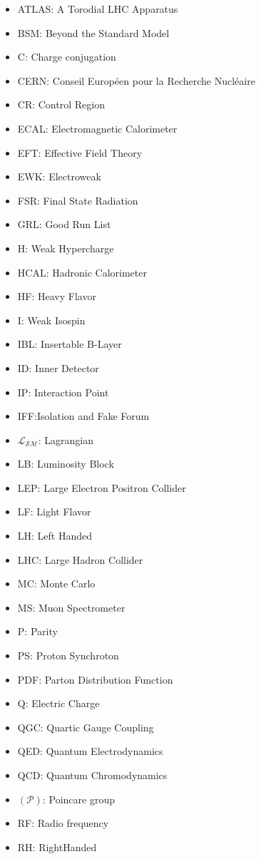 \begin{itemize}
\item{ATLAS: A Torodial LHC Apparatus}
\item{BSM: Beyond the Standard Model}
\item{C: Charge conjugation}
\item{CERN: Conseil Europ\'{e}en pour la Recherche Nucl\'{e}aire}
\item{CR: Control Region}
\item{ECAL: Electromagnetic Calorimeter} 
\item{EFT: Effective Field Theory}
\item{EWK: Electroweak}
\item{FSR: Final State Radiation}
\item{GRL: Good Run List}
\item{H: Weak Hypercharge}
\item{HCAL: Hadronic Calorimeter}
\item{HF: Heavy Flavor}
\item{I: Weak Isospin}
\item{IBL: Insertable B-Layer} 
\item{ID: Inner Detector} 
\item{IP: Interaction Point}
\item{IFF:Isolation and Fake Forum}
\item{$\mathcal{L_{SM}}$: Lagrangian}
\item{LB: Luminosity Block}
\item{LEP: Large Electron Positron Collider} 
\item{LF: Light Flavor} 
\item{LH:  Left Handed}
\item{LHC: Large Hadron Collider}
\item{MC: Monte Carlo}
\item{MS: Muon Spectrometer}
\item{P: Parity}
\item{PS: Proton Synchroton}
\item{PDF: Parton Distribution Function}
\item{Q: Electric Charge}
\item{QGC: Quartic Gauge Coupling}
\item{QED: Quantum Electrodynamics}
\item{QCD: Quantum Chromodynamics}
\item{$(\mathcal{P})$: Poincare group}
\item{RF: Radio frequency}
\item{RH: RightHanded}

\end{itemize}
